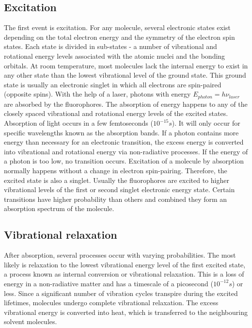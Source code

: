 \documentclass[twoside,single]{lion-msc}
\begin{document}
\subsection{Excitation}
The first event is excitation. For any molecule, several electronic states exist depending on the total electron energy and the symmetry of the electron spin states. Each state is divided in sub-states - a number of vibrational and rotational energy levels associated with the atomic nuclei and the bonding orbitals. At room temperature, most molecules lack the internal energy to exist in any other state than the lowest vibrational level of the ground state. This ground state is usually an electronic singlet in which all electrons are spin-paired (opposite spins). With the help of a laser, photons with energy $E_{photon}=h \nu_{laser}$ are absorbed by the fluorophores. The absorption of energy happens to any of the closely spaced vibrational and rotational energy levels of the excited states. Absorption of light occurs in a few femtoseconds ($10^{-15}s$). It will only occur for specific wavelengths known as the absorption bands. If a photon contains more energy than necessary for an electronic transition, the excess energy is converted into vibrational and rotational energy via non-radiative processes. If the energy of a photon is too low, no transition occurs. Excitation of a molecule by absorption normally happens without a change in electron spin-pairing. Therefore, the excited state is also a singlet. Usually the fluorophores are excited to higher vibrational levels of the first or second singlet electronic energy state. Certain transitions have higher probability than others and combined they form an absorption spectrum of the molecule.

\subsection{Vibrational relaxation}
After absorption, several processes occur with varying probabilities. The most likely is relaxation to the lowest vibrational energy level of the first excited state, a process known as internal conversion or vibrational relaxation. This is a loss of energy in a non-radiative matter and has a timescale of a picosecond ($10^{-12}s$) or less. Since a significant number of vibration cycles transpire during the excited lifetimes, molecules undergo complete vibrational relaxation. The excess vibrational energy is converted into heat, which is transferred to the neighbouring solvent molecules.
\end{document}
